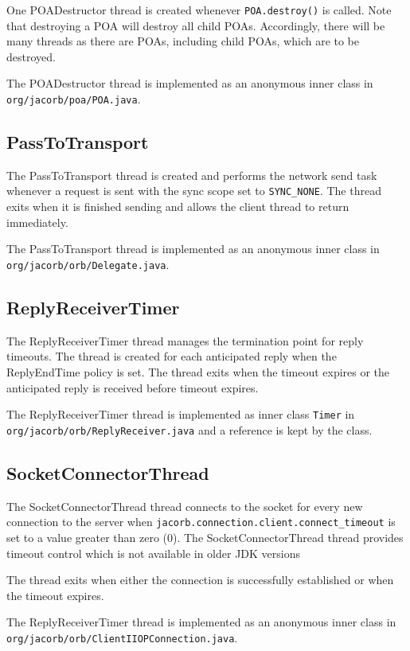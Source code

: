 One POADestructor thread is created whenever {\tt POA.destroy()} is called.
Note that destroying a POA will destroy all child POAs. Accordingly, there will
be many threads as there are POAs, including child POAs, which are to be
destroyed.

The POADestructor thread is implemented as an anonymous inner class in
{\tt org/jacorb/poa/POA.java}.

\subsection*{PassToTransport}
The PassToTransport thread is created and performs the network send task
whenever a request is sent with the sync scope set to {\tt SYNC\_NONE}. The
thread exits when it is finished sending and allows the client thread to return
immediately.

The PassToTransport thread is implemented as an anonymous inner class in
{\tt org/jacorb/orb/Delegate.java}.

\subsection*{ReplyReceiverTimer}
The ReplyReceiverTimer thread manages the termination point for reply timeouts.
The thread is created for each anticipated reply when the ReplyEndTime
policy is set. The thread exits when the timeout expires or the
anticipated reply is received before timeout expires.

The ReplyReceiverTimer thread is implemented as inner class {\tt Timer} in
{\tt org/jacorb/orb/ReplyReceiver.java} and a reference is kept by the class.

\subsection*{SocketConnectorThread}
The SocketConnectorThread thread connects to the socket for every new
connection to the server when {\tt jacorb.connection.client.connect\_timeout}
is set to a value greater than zero (0). The SocketConnectorThread thread
provides timeout control which is not available in older JDK versions

The thread exits when either the connection is successfully established or
when the timeout expires.

The ReplyReceiverTimer thread is implemented as an anonymous inner class in
{\tt org/jacorb/orb/ClientIIOP\-Connection.java}.
